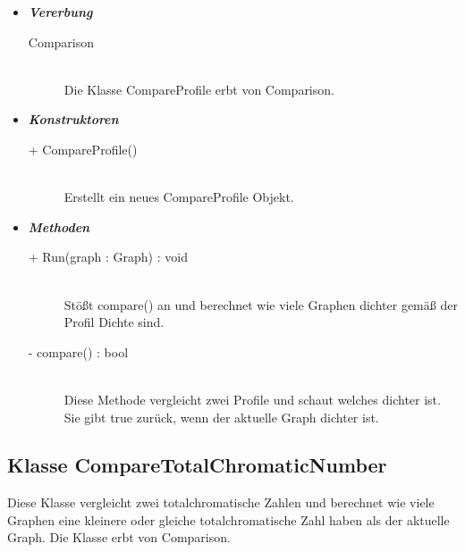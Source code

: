 \documentclass[13pt]{scrreprt}
\begin{document}
\begin{itemize} [label = {$\circ$}]
	\item {\large \textbf{\textit{Vererbung}}\par}
	\begin{description}
		\item[Comparison] \hfill \\Die Klasse CompareProfile erbt von Comparison.
	\end{description}
	\item {\large \textbf{\textit{Konstruktoren}}\par}
	\begin{description}
		\item[+ CompareProfile()] \hfill \\ Erstellt ein neues CompareProfile Objekt.
	\end{description}
	\item {\large \textbf{\textit{Methoden}}\par}
	\begin{description}
		\item[+ Run(graph : Graph) : void] \hfill \\Stößt compare() an und berechnet wie viele Graphen dichter gemäß der Profil Dichte sind.
		\item[- compare() : bool] \hfill \\Diese Methode vergleicht zwei Profile und schaut welches dichter ist. Sie gibt true zurück, wenn der aktuelle Graph dichter ist.
	\end{description}
\end{itemize}

\subsection{Klasse CompareTotalChromaticNumber}
Diese Klasse vergleicht zwei totalchromatische Zahlen und berechnet wie viele Graphen eine kleinere oder gleiche totalchromatische Zahl haben als der aktuelle Graph. Die Klasse erbt von Comparison.
\end{document}
